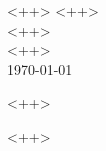 \documentclass[12pt]{article}
\newcommand{\first}{<++>}
\newcommand{\last} {<++>}
\newcommand{\prof} {<++>}
\newcommand{\class}{<++>}
\begin{document}
\begin{flushleft}

\first{} \last{} \\
\prof{} \\
\class{} \\
\today{} \\

\begin{center}
<++>
\end{center}

<++>

\printbibliography{}
\end{flushleft}
\end{document}
